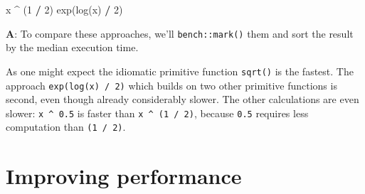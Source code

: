 \documentclass[
]{krantz}
\makeatletter
\newenvironment{Shaded}{\begin{snugshade}}{\end{snugshade}}
\newcommand{\CommentTok}[1]{\textcolor[rgb]{0.56,0.35,0.01}{\textit{#1}}}
\newcommand{\DecValTok}[1]{\textcolor[rgb]{0.00,0.00,0.81}{#1}}
\newcommand{\FloatTok}[1]{\textcolor[rgb]{0.00,0.00,0.81}{#1}}
\newcommand{\KeywordTok}[1]{\textcolor[rgb]{0.13,0.29,0.53}{\textbf{#1}}}
\newcommand{\NormalTok}[1]{#1}
\newcommand{\OperatorTok}[1]{\textcolor[rgb]{0.81,0.36,0.00}{\textbf{#1}}}
\newcommand{\StringTok}[1]{\textcolor[rgb]{0.31,0.60,0.02}{#1}}
\newenvironment{kframe}{%
\medskip{}
\setlength{\fboxsep}{.8em}
 \def\at@end@of@kframe{}%
 \ifinner\ifhmode%
  \def\at@end@of@kframe{\end{minipage}}%
  \begin{minipage}{\columnwidth}%
 \fi\fi%
 \def\FrameCommand##1{\hskip\@totalleftmargin \hskip-\fboxsep
 \colorbox{shadecolor}{##1}\hskip-\fboxsep
     \hskip-\linewidth \hskip-\@totalleftmargin \hskip\columnwidth}%
 \MakeFramed {\advance\hsize-\width
   \@totalleftmargin\z@ \linewidth\hsize
   \@setminipage}}%
 {\par\unskip\endMakeFramed%
 \at@end@of@kframe}
\renewenvironment{Shaded}{\begin{kframe}}{\end{kframe}}
\renewcommand{\KeywordTok} [1]{\textcolor[rgb]{0.00,0.44,0.13}{{#1}}}
\renewcommand{\DecValTok}  [1]{\textcolor[rgb]{0.25,0.63,0.44}{{#1}}}
\renewcommand{\FloatTok}   [1]{\textcolor[rgb]{0.25,0.63,0.44}{{#1}}}
\renewcommand{\StringTok}  [1]{\textcolor[rgb]{0.25,0.44,0.63}{{#1}}}
\renewcommand{\CommentTok} [1]{\textcolor[rgb]{0.38,0.63,0.69}{{#1}}}
\renewcommand{\NormalTok}  [1]{{#1}}
\makeatother
\begin{document}
\begin{Shaded}
\begin{Highlighting}[]
\NormalTok{x }\OperatorTok{^}\StringTok{ }\NormalTok{(}\DecValTok{1} \OperatorTok{/}\StringTok{ }\DecValTok{2}\NormalTok{)}
\KeywordTok{exp}\NormalTok{(}\KeywordTok{log}\NormalTok{(x) }\OperatorTok{/}\StringTok{ }\DecValTok{2}\NormalTok{)}
\end{Highlighting}
\end{Shaded}

\textbf{{A}}: To compare these approaches, we'll \texttt{bench::mark()} them and sort the result by the median execution time.

\begin{Shaded}
\end{Shaded}

As one might expect the idiomatic primitive function \texttt{sqrt()} is the fastest. The approach \texttt{exp(log(x)\ /\ 2)} which builds on two other primitive functions is second, even though already considerably slower. The other calculations are even slower: \texttt{x\ \^{}\ 0.5} is faster than \texttt{x\ \^{}\ (1\ /\ 2)}, because \texttt{0.5} requires less computation than \texttt{(1\ /\ 2)}.

\hypertarget{improving-performance}{%
\chapter{Improving performance}\label{improving-performance}}
\end{document}
